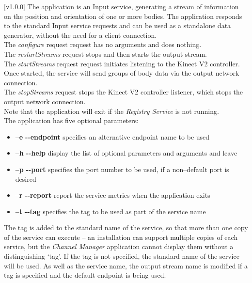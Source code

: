 [v1.0.0]
The  application is an Input service,
generating a stream of information on the position and orientation of one or more bodies.
The application responds to the standard Input service requests and can be used as a
standalone data generator, without the need for a client connection.\\

The \emph{configure} request request has no arguments and does nothing.\\

The \emph{restartStreams} request stops and then starts the output stream.\\

The \emph{startStreams} request request initiates listening to the Kinect V2 controller.
Once started, the service will send groups of body data via the output \yarp{} network
connection.\\

The \emph{stopStreams} request stops the Kinect V2 controller listener, which stops the
output \yarp{} network connection.\\ 

Note that the application will exit if the \emph{Registry Service} is not running.\\

The application has five optional parameters:
\begin{itemize}
\item \textbf{--e} \textbar{} \textbf{{-}{-}endpoint} specifies an alternative endpoint
name to be used
\item \textbf{--h} \textbar{} \textbf{{-}{-}help} display the list of optional parameters
and arguments and leave
\item \textbf{--p} \textbar{} \textbf{{-}{-}port} specifies the port number to be used, if
a non--default port is desired
\item \textbf{--r} \textbar{} \textbf{{-}{-}report} report the service metrics when the
application exits
\item \textbf{--t} \textbar{} \textbf{{-}{-}tag} specifies the tag to be used as part of
the service name
\end{itemize}
The tag is added to the standard name of the service, so that more than one copy of the
service can execute -- an \mplusm{} installation can support multiple copies of each
 service, but the \emph{Channel Manager} application cannot display them
without a distinguishing `tag'.
If the tag is not specified, the standard name of the service will be used.
As well as the service name, the output stream name is modified if a tag is specified and
the default endpoint is being used.\\

